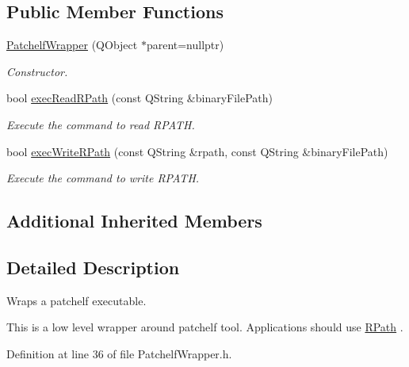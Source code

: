 \subsection*{Public Member Functions}
\begin{DoxyCompactItemize}
\item 
\hyperlink{class_mdt_1_1_deploy_utils_1_1_patchelf_wrapper_a39b4e6120c0932f455a07a5eafcecc5f}{Patchelf\+Wrapper} (Q\+Object $\ast$parent=nullptr)\hypertarget{class_mdt_1_1_deploy_utils_1_1_patchelf_wrapper_a39b4e6120c0932f455a07a5eafcecc5f}{}\label{class_mdt_1_1_deploy_utils_1_1_patchelf_wrapper_a39b4e6120c0932f455a07a5eafcecc5f}

\begin{DoxyCompactList}\small\item\em Constructor. \end{DoxyCompactList}\item 
bool \hyperlink{class_mdt_1_1_deploy_utils_1_1_patchelf_wrapper_a4f3fa64a95618c6bc87afd3760aded0a}{exec\+Read\+R\+Path} (const Q\+String \&binary\+File\+Path)
\begin{DoxyCompactList}\small\item\em Execute the command to read R\+P\+A\+TH. \end{DoxyCompactList}\item 
bool \hyperlink{class_mdt_1_1_deploy_utils_1_1_patchelf_wrapper_a3d637e3a04030f32987e1895be18c482}{exec\+Write\+R\+Path} (const Q\+String \&rpath, const Q\+String \&binary\+File\+Path)
\begin{DoxyCompactList}\small\item\em Execute the command to write R\+P\+A\+TH. \end{DoxyCompactList}\end{DoxyCompactItemize}
\subsection*{Additional Inherited Members}


\subsection{Detailed Description}
Wraps a patchelf executable. 

This is a low level wrapper around patchelf tool. Applications should use \hyperlink{class_mdt_1_1_deploy_utils_1_1_r_path}{R\+Path} . 

Definition at line 36 of file Patchelf\+Wrapper.\+h.



